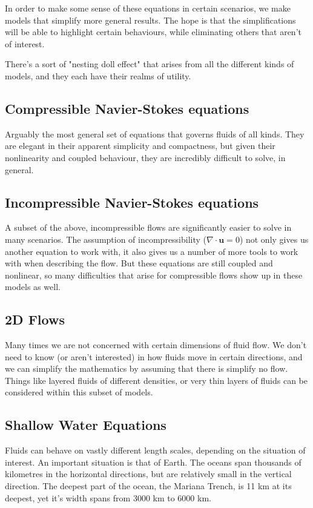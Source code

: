 \documentclass[12pt, twoside, letterpaper]{article}
\begin{document}
In order to make some sense of these equations in certain scenarios, we make models that simplify more general results. The hope is that the simplifications will be able to highlight certain behaviours, while eliminating others that aren't of interest.

There's a sort of "nesting doll effect" that arises from all the different kinds of models, and they each have their realms of utility.

\subsection{Compressible Navier-Stokes equations}
Arguably the most general set of equations that governs fluids of all kinds. They are elegant in their apparent simplicity and compactness, but given their nonlinearity and coupled behaviour, they are incredibly difficult to solve, in general.

\subsection{Incompressible Navier-Stokes equations}
A subset of the above, incompressible flows are significantly easier to solve in many scenarios. The assumption of incompressibility ($\nabla \cdot \textbf{u} = 0$) not only gives us another equation to work with, it also gives us a number of more tools to work with when describing the flow. But these equations are still coupled and nonlinear, so many difficulties that arise for compressible flows show up in these models as well.

\subsection{2D Flows}
Many times we are not concerned with certain dimensions of fluid flow. We don't need to know (or aren't interested) in how fluids move in certain directions, and we can simplify the mathematics by assuming that there is simplify no flow. Things like layered fluids of different densities, or very thin layers of fluids can be considered within this subset of models.

\subsection{Shallow Water Equations}
Fluids can behave on vastly different length scales, depending on the situation of interest. An important situation is that of Earth. The oceans span thousands of kilometres in the horizontal directions, but are relatively small in the vertical direction. The deepest part of the ocean, the Mariana Trench, is 11 km at its deepest, yet it's width spans from 3000 km to 6000 km.
\end{document}
